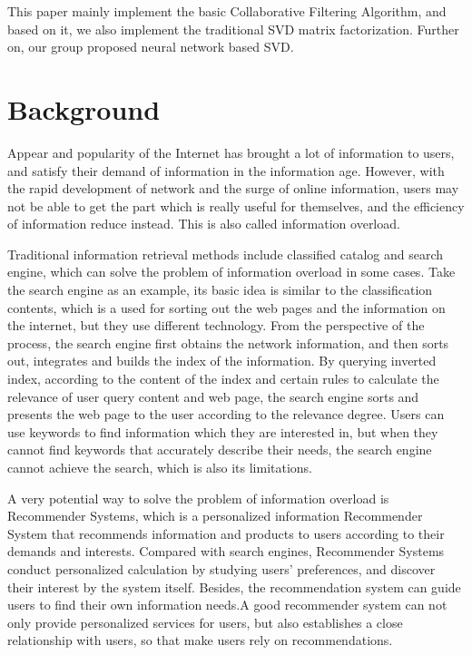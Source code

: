 \documentclass{acmtog} %
\begin{document}
This paper mainly implement the basic Collaborative Filtering Algorithm, and based on it, we also implement the traditional SVD matrix factorization. Further on, our group proposed neural network based SVD\cite{he2017neural}.

\section{Background}
Appear and popularity of the Internet has brought a lot of information to users, and satisfy their demand of information in the information age. However, with the rapid development of network and the surge of online information, users may not be able to get the part which is really useful for themselves, and the efficiency of information reduce instead. This is also called information overload. 

Traditional information retrieval methods include classified catalog and search engine, which can solve the problem of information overload in some cases. Take the search engine as an example, its basic idea is similar to the classification contents, which is a used for sorting out the web pages and the information on the internet, but they use different technology. From the perspective of the process, the search engine first obtains the network information, and then sorts out, integrates and builds the index of the information. By querying inverted index, according to the content of the index and certain rules to calculate the relevance of user query content and web page, the search engine sorts and presents the web page to the user according to the relevance degree. Users can use keywords to find information which they are interested in, but when they cannot find keywords that accurately describe their needs, the search engine cannot achieve the search, which is also its limitations.

A very potential way to solve the problem of information overload is Recommender Systems, which is a personalized information Recommender System that recommends information and products to users according to their demands and interests. Compared with search engines, Recommender Systems conduct personalized calculation by studying users' preferences, and discover their interest by the system itself. Besides, the recommendation system can guide users to find their own information needs.A good recommender system can not only provide personalized services for users, but also establishes a close relationship with users, so that make users rely on recommendations. 
\end{document}
